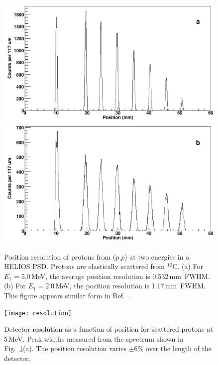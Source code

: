\begin{figure}
\centering
\includegraphics[height=0.45\textheight,width=\linewidth,keepaspectratio]{Figures/out3}
\includegraphics[height=0.45\textheight,width=\linewidth,keepaspectratio]{Figures/out4}
\caption[Position resolution of protons from ($p$,$p$) at two energies in a HELIOS PSD]{Position resolution of protons from ($p$,$p$) at two energies in a HELIOS PSD. Protons are elastically scattered from $^{12}$C.  (a) For $E_1=5.0$\,MeV, the average position resolution is 0.532\,mm~FWHM.  (b) For $E_1=2.0$\,MeV, the position resolution is 1.17\,mm~FWHM.  This figure appears similar form in Ref.~\cite{Lighthall_2010}.}
\label{psd_pos}
\end{figure}

\begin{figure}%
\texttt{[image: resolution]}%
\caption[Detector resolution as a function of position for scattered protons at 5\,MeV]{Detector resolution as a function of position for scattered protons at 5\,MeV.  Peak widths measured from the spectrum shown in Fig.~\ref{psd_pos}(a).  The position resolution varies $\pm6$\% over the length of the detector.}%
\label{res_fig}%
\end{figure}

